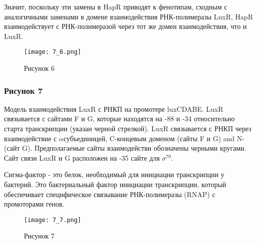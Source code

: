 Значит, поскольку эти замены в HapR приводят к фенотипам, сходным с аналогичными заменами в домене взаимодействия РНК-полимеразы LuxR,  HapR взаимодействует с РНК-полимеразой через тот же домен взаимодействия, что и LuxR. 


\begin{figure}
    \centering
    \texttt{[image: 7\_6.png]}
    \caption{Рисунок 6}
    \label{fig:7_6}
\end{figure}

\subsubsection{Рисунок 7}

Модель взаимодействия LuxR с РНКП на промотере luxCDABE. LuxR связывается с сайтами F и G, которые находятся на -88 и -34 относительно старта транскрипции (указан черной стрелкой). LuxR связывается с РНКП через взаимодействие с $\alpha$субъединицей, C-концевым доменом (сайты F и G) and N- (сайт G). Предполагаемые сайты взаимодействи обозначены черными кругами. Сайт связи LuxR и G расположен на -35 сайте для $\sigma^{70}$.

Сигма-фактор - это белок, необходимый для инициации транскрипции у бактерий. Это бактериальный фактор инициации транскрипции, который обеспечивает специфическое связывание РНК-полимеразы (RNAP) с промоторами генов.
\begin{figure}
    \centering
    \texttt{[image: 7\_7.png]}
    \caption{Рисунок 7}
    \label{fig:7_7}
\end{figure}